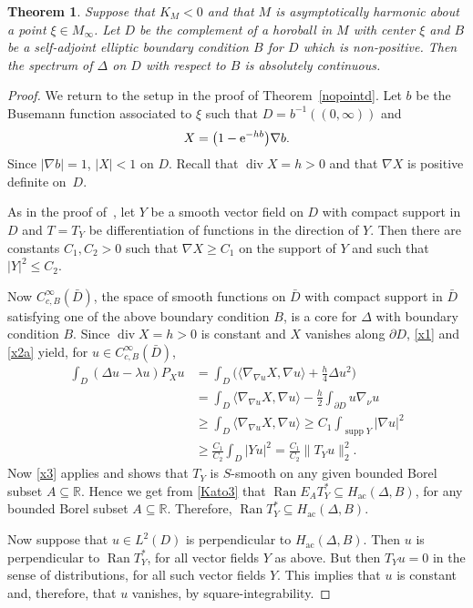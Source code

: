 \documentclass[pdftex]{sigma}
\numberwithin{equation}{section}
\newtheorem{Theorem}{Theorem}[section]
\DeclareMathOperator{\diver}{div}
\DeclareMathOperator{\ran}{Ran}
\DeclareMathOperator{\supp}{supp}
\def\ac{\mathrm{ac}}
\def\R{\mathbb R}
\begin{document}
\begin{Theorem}%
Suppose that $K_M<0$ and that $M$ is asymptotically harmonic about a point $\xi\in M_\infty$.
Let $D$ be the complement of a horoball in $M$ with center $\xi$
and $B$ be a self-adjoint elliptic boundary condition $B$ for $D$ which is non-positive.
Then the spectrum of $\Delta$ on $D$ with respect to $B$ is absolutely continuous.
\end{Theorem}

\begin{proof}
We return to the setup in the proof of Theorem~\ref{nopointd}.
Let $b$ be the Busemann function associated to $\xi$ such that $D=b^{-1}((0,\infty))$
and
\begin{align*}
 X = \bigl(1 - {\rm e}^{-hb}\bigr)\nabla b.
\end{align*}
Since $|\nabla b|=1$, $|X|<1$ on $D$.
Recall that $\diver X=h>0$ and that $\nabla X$ is positive definite on~$D$.

As in the proof of~\cite[Theorem~2]{Xavier1988}, let $Y$ be a smooth vector field on $D$ with compact support
in $D$ and $T=T_Y$ be differentiation of functions in the direction of $Y$.
Then there are constants $C_1,C_2>0$ such that $\nabla X\ge C_1$ on the support of $Y$
and such that $|Y|^2\le C_2$.

Now $C^\infty_{c,B}(\bar D)$, the space of smooth functions on $\bar D$ with compact support in $\bar D$
satisfying one of the above boundary condition $B$, is a core for $\Delta$ with boundary condition $B$.
Since $\diver X=h>0$ is constant and $X$ vanishes along $\partial D$, \eqref{x1} and \eqref{x2a} yield,
for $u\in C^\infty_{c,B}(\bar D)$,
\begin{align*}
 \int_D (\Delta u-\lambda u) P_Xu
 &= \int_D \biggl(\langle\nabla_{\nabla u}X,\nabla u\rangle + \frac{h}4\Delta u^2\biggr) \\
 &= \int_D \langle\nabla_{\nabla u}X,\nabla u\rangle - \frac{h}2\int_{\partial D}u\nabla_\nu u \\
 &\ge \int_D \langle\nabla_{\nabla u}X,\nabla u\rangle \ge C_1 \int_{\supp Y}|\nabla u|^2 \\
 &\ge \frac{C_1}{C_2}\int_D|Yu|^2 = \frac{C_1}{C_2}\|T_Yu\|_2^2.
\end{align*}
Now \eqref{x3} applies and shows that $T_Y$ is $S$-smooth on any given bounded Borel subset $A\subseteq\R$.
Hence we get from \eqref{Kato3} that $\ran E_AT_Y^*\subseteq H_{\ac}(\Delta,B)$, for any bounded Borel subset $A\subseteq\R$.
Therefore, $\ran T_Y^*\subseteq H_{\ac}(\Delta,B)$.

Now suppose that $u\in L^2(D )$ is perpendicular to $H_{\ac}(\Delta,B)$.
Then $u$ is perpendicular to $\ran T_Y^*$, for all vector fields $Y$ as above.
But then $T_Yu=0$ in the sense of distributions, for all such vector fields $Y$.
This implies that $u$ is constant and, therefore, that $u$ vanishes, by square-integrability.
\end{proof}
\end{document}

